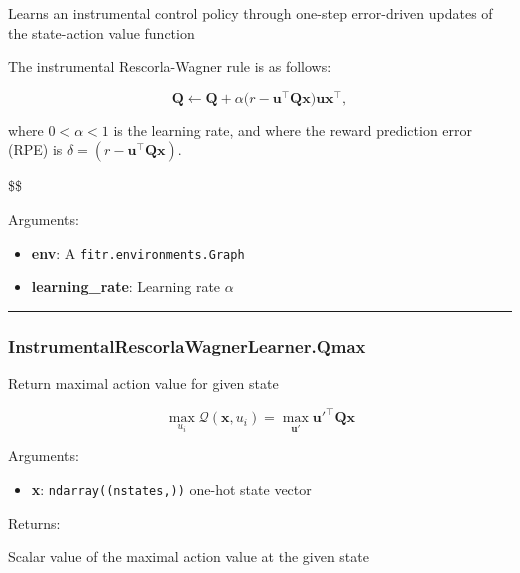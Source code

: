 Learns an instrumental control policy through one-step error-driven
updates of the state-action value function

The instrumental Rescorla-Wagner rule is as follows:

\[
\mathbf Q \gets \mathbf Q + \alpha \big(r - \mathbf u^\top \mathbf Q \mathbf x \big) \mathbf u \mathbf x^\top,
\]

where \(0 < \alpha < 1\) is the learning rate, and where the reward
prediction error (RPE) is
\(\delta = (r - \mathbf u^\top \mathbf Q \mathbf x)\).

\$\$

Arguments:

\begin{itemize}
\tightlist
\item
  \textbf{env}: A \texttt{fitr.environments.Graph}
\item
  \textbf{learning\_rate}: Learning rate \(\alpha\)
\end{itemize}

\begin{center}\rule{0.5\linewidth}{\linethickness}\end{center}

\hypertarget{instrumentalrescorlawagnerlearner.qmax}{%
\subsubsection{InstrumentalRescorlaWagnerLearner.Qmax}\label{instrumentalrescorlawagnerlearner.qmax}}

\begin{Shaded}
\begin{Highlighting}[]
\end{Highlighting}
\end{Shaded}

Return maximal action value for given state

\[
\max_{u_i}\mathcal Q(\mathbf x, u_i) = \max_{\mathbf u'} \mathbf u'^\top \mathbf Q \mathbf x
\]

Arguments:

\begin{itemize}
\tightlist
\item
  \textbf{x}: \texttt{ndarray((nstates,))} one-hot state vector
\end{itemize}

Returns:

Scalar value of the maximal action value at the given state

